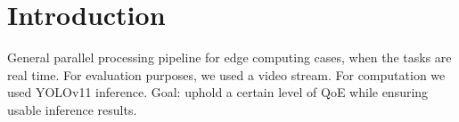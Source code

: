 \chapter{Introduction}
General parallel processing pipeline for edge computing cases, when the tasks are real time. For evaluation purposes, we used a video stream. For computation we used YOLOv11 inference.
Goal: uphold a certain level of QoE while ensuring usable inference results.